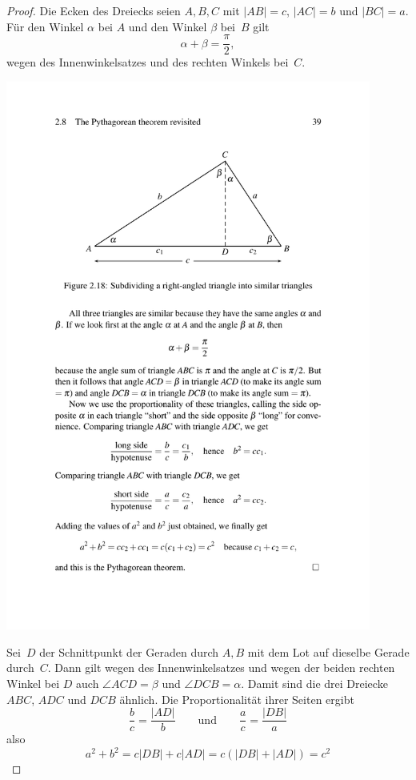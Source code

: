 \begin{proof}
Die Ecken des Dreiecks seien $A,B,C$ mit $|AB|=c$, $|AC|=b$ und
$|BC|=a$. Für den Winkel $\alpha$ bei $A$ und den Winkel $\beta$
bei~$B$ gilt
$$
\alpha + \beta = \frac{\pi}{2},
$$
wegen des Innenwinkelsatzes und des rechten Winkels bei~$C$.


\centerline{\includegraphics[width=12cm]{BILDER/BildBeweisPythagoras.pdf}}


Sei~$D$ der Schnittpunkt der Geraden durch $A,B$ mit dem Lot auf
dieselbe Gerade durch~$C$. Dann gilt wegen des
Innenwinkelsatzes und wegen der beiden rechten Winkel bei $D$ auch
$\angle ACD = \beta$ und $\angle DCB = \alpha$.
Damit sind die drei Dreiecke 
$ABC$, $ADC$ und $DCB$ ähnlich.
Die Proportionalität ihrer Seiten ergibt
$$
\frac{b}{c} = \frac{|AD|}{b} 
\qquad \mbox{und} \qquad 
\frac{a}{c} = \frac{|DB|}{a} 
$$
also
$$
a^2+b^2 = c |DB| + c |AD| = c (|DB| + |AD|) = c^2
$$
\end{proof}





